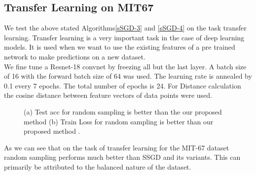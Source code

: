 \documentclass[a4paper,twoside]{iiththesis}
\theoremstyle{definition}
\theoremstyle{definition}
\theoremstyle{remark}
\begin{document}
\subsection{Transfer Learning on MIT67 }
We test the above stated Algorithms\ref{sSGD-3} and \ref{sSGD-4} on the task transfer learning. Transfer learning is a very important task in the case of deep learning models. It is used when we want to use the existing features of a pre trained network to make predictions on a new dataset. \\
We fine tune a Resnet-18 convnet by freezing all but the last layer. A batch size of 16 with the forward batch size of 64 was used. The learning rate is annealed by 0.1 every 7 epochs.
The total number of epochs is 24. For Distance calculation the cosine distance between feature vectors of data points were used. 

\begin{figure}[H]
    \caption{(a) Test acc for random sampling is better than the our proposed method (b) Train Loss for random sampling is better than our proposed method .}
    \label{fig:Transfer learning}
\end{figure}
As we can see that on the task of transfer learning for the MIT-67 dataset random sampling performs much better than SSGD and its variants. This can primarily be attributed to the balanced nature of the dataset.
\end{document}
